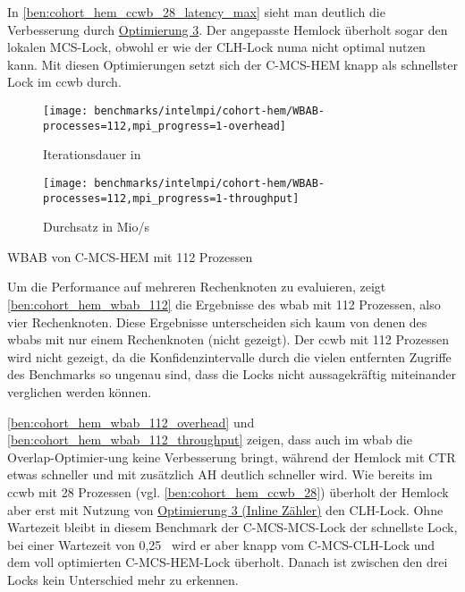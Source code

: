 In \autoref{ben:cohort_hem_ccwb_28_latency_max} sieht man deutlich die Verbesserung durch \hyperref[sec:cohort_opt_3]{Optimierung 3}.
Der angepasste Hemlock überholt sogar den lokalen MCS-Lock,
obwohl er wie der CLH-Lock \gls{numa} nicht optimal nutzen kann.
Mit diesen Optimierungen setzt sich der C-MCS-HEM knapp als schnellster Lock im \gls{ccwb} durch.

\begin{benchmark}[h]
    \begin{subfigure}{.5\textwidth}
        \texttt{[image: benchmarks/intelmpi/cohort-hem/WBAB-processes=112,mpi\_progress=1-overhead]}
        \caption{Iterationsdauer in }
        \label{ben:cohort_hem_wbab_112_overhead}
    \end{subfigure}
    \begin{subfigure}{.5\textwidth}
        \texttt{[image: benchmarks/intelmpi/cohort-hem/WBAB-processes=112,mpi\_progress=1-throughput]}
        \caption{Durchsatz in Mio/s}
        \label{ben:cohort_hem_wbab_112_throughput}
    \end{subfigure}
    \caption{WBAB von C-MCS-HEM mit 112 Prozessen}
    \label{ben:cohort_hem_wbab_112}
\end{benchmark}

Um die Performance auf mehreren Rechenknoten zu evaluieren,
zeigt \autoref{ben:cohort_hem_wbab_112} die Ergebnisse des \gls{wbab}
mit 112 Prozessen,
also vier Rechenknoten.
Diese Ergebnisse unterscheiden sich kaum
von denen des \gls{wbab}s mit nur einem Rechenknoten (nicht gezeigt).
Der \gls{ccwb} mit 112 Prozessen wird nicht gezeigt,
da die Konfidenzintervalle durch die vielen entfernten Zugriffe des Benchmarks so ungenau sind,
dass die Locks nicht aussagekräftig miteinander verglichen werden können.

\autoref{ben:cohort_hem_wbab_112_overhead} und \autoref{ben:cohort_hem_wbab_112_throughput} zeigen,
dass auch im \gls{wbab} die Overlap-Optimier-ung keine Verbesserung bringt,
während der Hemlock mit CTR etwas schneller
und mit zusätzlich AH deutlich schneller wird.
Wie bereits im \gls{ccwb} mit 28 Prozessen (vgl. \autoref{ben:cohort_hem_ccwb_28}) überholt der Hemlock aber erst mit Nutzung von \hyperref[sec:cohort_opt_3]{Optimierung 3 (Inline Zähler)}
den CLH-Lock.
Ohne Wartezeit bleibt in diesem Benchmark der C-MCS-MCS-Lock der schnellste Lock,
bei einer Wartezeit von 0,25~ wird er aber knapp vom C-MCS-CLH-Lock und dem voll optimierten C-MCS-HEM-Lock überholt.
Danach ist zwischen den drei Locks kein Unterschied mehr zu erkennen.

